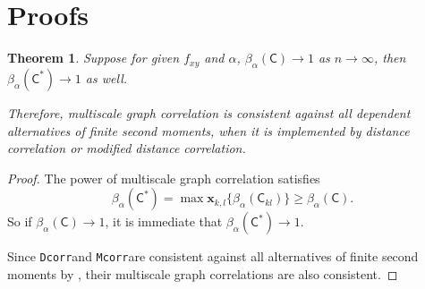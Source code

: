 \documentclass[11pt]{article}
\providecommand{\sct}[1]{{\sc \texttt{#1}}}
\providecommand{\mb}[1]{\boldsymbol{#1}}
\newcommand{\G}{\mathsf{C}}
\newcommand{\Dcorr}{\sct{Dcorr}}
\newcommand{\Mcorr}{\sct{Mcorr}}
\newcommand{\mbx}{\ensuremath{\mb{x}}}
\newtheorem{appThm}{Theorem}
\begin{document}
\section{Proofs}
\label{appen:proofs}
\begin{appThm}
Suppose for given $f_{xy}$ and $\alpha$, $\beta_{\alpha}(\G) \rightarrow 1$ as $n \rightarrow \infty$, then $\beta_{\alpha}(\G^{*}) \rightarrow 1$ as well.

Therefore, multiscale graph correlation is consistent against all dependent alternatives of finite second moments, when it is implemented by distance correlation or modified distance correlation.
\end{appThm}
\begin{proof}
The power of multiscale graph correlation satisfies
\begin{equation}
\beta_{\alpha}(\G^{*})=\max\mbx_{k,l}\{\beta_{\alpha}(\G_{kl})\} \geq \beta_{\alpha}(\G).
\end{equation}
So if $\beta_{\alpha}(\G) \rightarrow 1$, it is immediate that $\beta_{\alpha}(\G^{*}) \rightarrow 1$.

Since \Dcorr and \Mcorr are consistent against all alternatives of finite second moments by \cite{SzekelyRizzoBakirov2007, SzekelyRizzo2013a}, their multiscale graph correlations are also consistent.
\end{proof}
\end{document}

